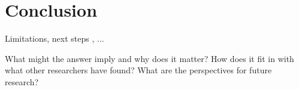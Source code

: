 \chapter{Conclusion}

Limitations, next steps , ...

What might the answer imply and why does it matter? How does it fit in with what other researchers have found? What are the perspectives for future research?
